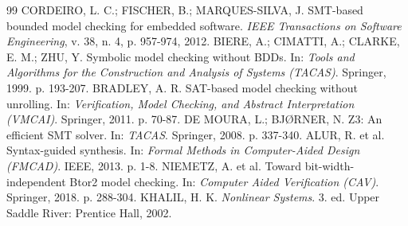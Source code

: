 \documentclass[11pt,a4paper]{article}
\theoremstyle{definition}
\begin{document}
\vspace{0.4cm}
\begin{thebibliography}{99}
 CORDEIRO, L. C.; FISCHER, B.; MARQUES-SILVA, J. SMT-based bounded model checking for embedded software. \textit{IEEE Transactions on Software Engineering}, v. 38, n. 4, p. 957-974, 2012.
 BIERE, A.; CIMATTI, A.; CLARKE, E. M.; ZHU, Y. Symbolic model checking without BDDs. In: \textit{Tools and Algorithms for the Construction and Analysis of Systems (TACAS)}. Springer, 1999. p. 193-207.
 BRADLEY, A. R. SAT-based model checking without unrolling. In: \textit{Verification, Model Checking, and Abstract Interpretation (VMCAI)}. Springer, 2011. p. 70-87.
 DE MOURA, L.; BJ{\O}RNER, N. Z3: An efficient SMT solver. In: \textit{TACAS}. Springer, 2008. p. 337-340.
 ALUR, R. et al. Syntax-guided synthesis. In: \textit{Formal Methods in Computer-Aided Design (FMCAD)}. IEEE, 2013. p. 1-8.
 NIEMETZ, A. et al. Toward bit-width-independent Btor2 model checking. In: \textit{Computer Aided Verification (CAV)}. Springer, 2018. p. 288-304.
 KHALIL, H. K. \textit{Nonlinear Systems}. 3. ed. Upper Saddle River: Prentice Hall, 2002.
\end{thebibliography}
\end{document}
